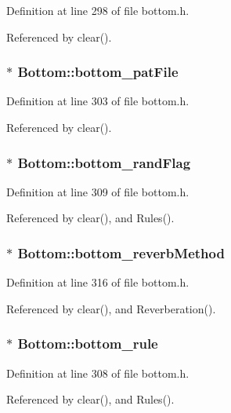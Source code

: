 Definition at line 298 of file bottom.h.

Referenced by clear().
\subsubsection{$\ast$ {\bf Bottom::bottom\_\-pat\-File}}\label{classBottom_o5}




Definition at line 303 of file bottom.h.

Referenced by clear().
\subsubsection{$\ast$ {\bf Bottom::bottom\_\-rand\-Flag}}\label{classBottom_o11}




Definition at line 309 of file bottom.h.

Referenced by clear(), and Rules().
\subsubsection{$\ast$ {\bf Bottom::bottom\_\-reverb\-Method}}\label{classBottom_o18}




Definition at line 316 of file bottom.h.

Referenced by clear(), and Reverberation().
\subsubsection{$\ast$ {\bf Bottom::bottom\_\-rule}}\label{classBottom_o10}




Definition at line 308 of file bottom.h.

Referenced by clear(), and Rules().
